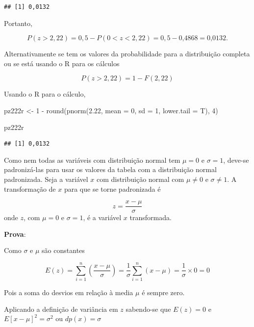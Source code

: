\documentclass[
]{book}
\newenvironment{Shaded}{\begin{snugshade}}{\end{snugshade}}
\newcommand{\AttributeTok}[1]{\textcolor[rgb]{0.77,0.63,0.00}{#1}}
\newcommand{\DecValTok}[1]{\textcolor[rgb]{0.00,0.00,0.81}{#1}}
\newcommand{\FloatTok}[1]{\textcolor[rgb]{0.00,0.00,0.81}{#1}}
\newcommand{\FunctionTok}[1]{\textcolor[rgb]{0.00,0.00,0.00}{#1}}
\newcommand{\NormalTok}[1]{#1}
\newcommand{\OtherTok}[1]{\textcolor[rgb]{0.56,0.35,0.01}{#1}}
\newcommand{\SpecialCharTok}[1]{\textcolor[rgb]{0.00,0.00,0.00}{#1}}
\begin{document}
\begin{verbatim}
## [1] 0,0132
\end{verbatim}

Portanto,

\[
  P(z>2,22) = 0,5 - P(0 < z < 2,22) = 0,5 - \text{0,4868} = \text{0,0132}. 
\]

Alternativamente se tem os valores da probabilidade para a distribuição completa ou se está usando o R para os cálculos

\[
  P(z >2,22) = 1 - F(2,22)
\]

Usando o R para o cálculo,

\begin{Shaded}
\begin{Highlighting}[]
\NormalTok{pz222r }\OtherTok{\textless{}{-}} \DecValTok{1} \SpecialCharTok{{-}} \FunctionTok{round}\NormalTok{(}\FunctionTok{pnorm}\NormalTok{(}\FloatTok{2.22}\NormalTok{, }\AttributeTok{mean =} \DecValTok{0}\NormalTok{, }\AttributeTok{sd =} \DecValTok{1}\NormalTok{, }\AttributeTok{lower.tail =}\NormalTok{ T), }
    \DecValTok{4}\NormalTok{)}

\NormalTok{pz222r}
\end{Highlighting}
\end{Shaded}

\begin{verbatim}
## [1] 0,0132
\end{verbatim}

Como nem todas as variáveis com distribuição normal tem \(\mu=0\) e \(\sigma = 1\), deve-se padronizá-las para usar os valores da tabela com a distribuição normal padronizada. Seja a variável \(x\) com distribuição normal com \(\mu\neq0\) e \(\sigma \neq 1\). A transformação de \(x\) para que se torne padronizada é

\[
  z = \dfrac{x - \mu}{\sigma}
  \label{eq:PadronizacaoNormal}
\]
onde \(z\), com \(\mu = 0\) e \(\sigma = 1\), é a variável \(x\) transformada.

\textbf{Prova}:

Como \(\sigma\) e \(\mu\) são constantes

\[
  E(z) = \sum_{i=1}^{n} \left(\dfrac{x - \mu}{\sigma}\right) =
  \dfrac{1}{\sigma}\sum_{i=1}^{n}(x - \mu) = \dfrac{1}{\sigma}\times 0 = 0
\]

Pois a soma do desvios em relação à media \(\mu\) é sempre zero.

Aplicando a definição de variância em \(z\) sabendo-se que \(E(z)=0\) e \(E[x-\mu]^2 = \sigma^2\) ou \(dp(x) = \sigma\)
\end{document}
